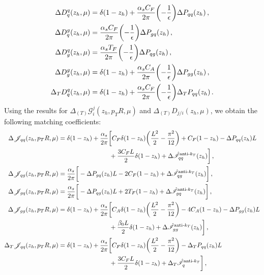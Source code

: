 \documentclass[a4paper, 11 pt]{article}
\begin{document}
\begin{align}
\Delta D_q^q (z_h, \mu)
& =
\delta (1-z_h) + \frac{\alpha _s C_F}{2 \pi} \pqty{-\frac{1}{\epsilon}} \Delta P_{qq}(z_h)\, , \\
\Delta D_q^g (z_h, \mu)
& =
\frac{\alpha _s C_F}{2 \pi} \pqty{-\frac{1}{\epsilon}} \Delta P_{gq}(z_h)\, , \\
\Delta D_g^q (z_h, \mu)
& =
\frac{\alpha _s T_F}{2 \pi} \pqty{-\frac{1}{\epsilon}} \Delta P_{qg}(z_h) \,, \\
\Delta D_g^g (z_h, \mu)
& =
\delta (1-z_h) + \frac{\alpha _s C_A}{2 \pi} \pqty{-\frac{1}{\epsilon}} \Delta P_{gg}(z_h) \,, \\
\Delta _T D_q^q (z_h, \mu)
& =
\delta (1-z_h) + \frac{\alpha _s C_F}{2 \pi} \pqty{-\frac{1}{\epsilon}} \Delta _T P_{qq}(z_h) \,.
\end{align}
Using the results for $\Delta _{(T)} \mathscr{G}_i^j (z_h, p_TR, \mu)$ and $\Delta _{(T)} D_{j/i} (z_h, \mu)$, we obtain the following matching coefficients:
\begin{align}
\Delta \mathscr{J}_{q q} (z_h, p_TR, \mu)
& =
\delta (1-z_h) + \frac{\alpha _s}{2 \pi} \bigg[C_F \delta (1-z_h) \pqty{\frac{L^2}{2}-\frac{\pi^2}{12}} + C_F (1-z_h) - \Delta P_{qq}(z_h) L
\nonumber \\
& \qquad \qquad \qquad \qquad +
\frac{3 C_F L}{2} \delta \pqty{1 - z_h} + \Delta \hat{\mathscr{I}}_{qq}^{\text{anti-}k_T} \pqty{z_h} \bigg]
\, , \\
\Delta \mathscr{J}_{qg} (z_h, p_TR, \mu)
& =
\frac{\alpha _s}{2\pi} \bigg[-\Delta P_{gq}(z_h) L- 2 C_F (1-z_h) + \Delta \hat{\mathscr{I}}_{qg}^{\text{anti-}k_T}(z_h) \bigg]
\, , \\
\Delta \mathscr{J}_{gq} (z_h, p_TR, \mu)
& =
\frac{\alpha _s}{2 \pi} \bigg[-\Delta P_{qg}(z_h) L + 2 T_F (1-z_h) + \Delta \hat{\mathscr{I}}_{gq}^{\text{anti-}k_T}(z_h)\bigg]
\, , \\
\Delta \mathscr{J}_{gg} (z_h, p_TR, \mu)
& =
\delta (1-z_h) + \frac{\alpha _s}{2 \pi} \bigg[C_A \delta (1-z_h) \pqty{\frac{L^2}{2}-\frac{\pi^2}{12}} - 4 C_A (1-z_h) - \Delta P_{gg}(z_h) L
\nonumber \\
& \qquad \qquad \qquad \qquad +
\frac{\beta _0 L}{2} \delta \pqty{1 - z_h} + \Delta\hat{\mathscr{I}}_{g g}^{\text{anti-}k_T}(z_h)\bigg]
\, , \\
\Delta _T \mathscr{J}_{qq} (z_h, p_TR, \mu)
& =
\delta (1-z_h) + \frac{\alpha _s}{2 \pi} \bigg[C_F \delta (1-z_h) \pqty{\frac{L^2}{2}-\frac{\pi^2}{12}} - \Delta _T P_{qq}(z_h) L
\nonumber \\
& \qquad \qquad \qquad \qquad +
\frac{3 C_F L}{2} \delta \pqty{1 - z_h} + \Delta _T \hat{\mathscr{I}}_q^{\text{anti-}k_T} \bigg]
\, ,
\end{align}
\end{document}
